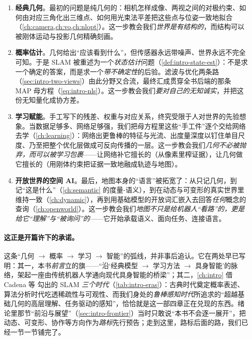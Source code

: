 \begin{enumerate}
  \item \textbf{经典几何}。最初的问题是纯几何的：相机怎样成像、两视之间的对极约束、如何由对应三角化出三维点、如何用光束法平差把这些点与位姿一致地拟合（\cref{ch:camera,ch:vo,ch:nlopt}）。这一步教会我们\emph{世界是有结构的}，而结构可以被刚体运动与投影几何精确刻画。
  \item \textbf{概率估计}。几何给出“应该看到什么”，但传感器永远带噪声、世界永远不完全可知。于是 SLAM 被重述为一个\emph{状态估计}问题（\cref{def:intro-state-est}）：不是求一个确定的答案，而是求一个\emph{带不确定性}的后验。滤波与优化两条路（\cref{sec:intro-two-views}）由此分野又合流，最终汇成贯穿全书后端的那条 MAP 母方程（\cref{eq:intro-nls}）。这一步教会我们\emph{要对自己的无知诚实}，并把这份无知量化成协方差。
  \item \textbf{学习赋能}。手工写下的残差、权重与对应关系，终究受限于人对世界的先验想象。当数据足够多、网络足够强，我们把母方程里这些“手工件”逐个交给网络去学（\cref{ch:learning}）：网络出更鲁棒的特征与光流、出度量深度以钉住单目尺度、乃至把整个优化层做成可反向传播的一层。这一步教会我们\emph{几何不必被抛弃，而可以被学习\emph{包裹}}——让网络补它擅长的（从像素里榨证据），让几何做它擅长的（用刚体约束把证据一致地融成轨迹与地图）。
  \item \textbf{开放世界的空间 AI}。最后，地图本身的“语言”被拓宽了：从只记几何，到记“这是什么”（\cref{ch:semantic} 的度量-语义），到在动态与可变形的真实世界里维持一致（\cref{ch:dynamic}），再到用基础模型的开放词汇嵌入去回答\emph{任何}概念的查询（\cref{ch:openworld}）。这一步教会我们\emph{地图不只是给机器人“看路”的，更是给它“理解”与“被询问”的}——它开始承载语义、面向任务、连接语言。
\end{enumerate}

\paragraph{这正是开篇许下的承诺。}
这条“几何 $\to$ 概率 $\to$ 学习 $\to$ 智能”的弧线，并非事后追认。它在两处早已写明：其一，本书\emph{前言}立的旗——“沿‘经典模型 $\to$ 学习方法 $\to$ 具身智能’的脉络，架起一座由传统机器人学通向现代具身智能的桥梁”；其二，\cref{ch:intro} 借 Cadena 等\cite{cadena2016past} 勾出的 SLAM \emph{三个时代}（\cref{tab:intro-eras}）：古典时代奠定概率表述、算法分析时代吃透稀疏性与可观性、而我们身处的\emph{鲁棒感知时代}所追求的“超越基础几何的高层理解、任务驱动的感知”，恰恰就是这一部四章正在兑现的东西。绪论里那节“前沿与展望”（\cref{sec:intro-frontier}）当时只敢说“本书不会逐一展开”，把动态、可变形、协作等方向作为\emph{路标}先行预告；走到这里，路标后面的路，我们已经一节一节铺完了。

